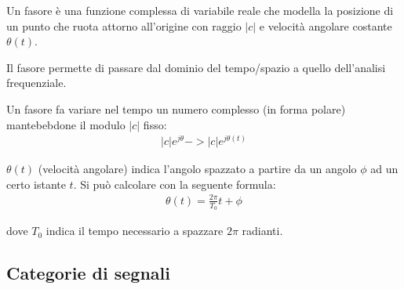 \documentclass[a4paper, 10pt]{report}
\begin{document}
\begin{tcolorbox}[title=\textbf{Fasore}]
Un fasore è una funzione complessa di variabile reale che modella la posizione di un punto che ruota attorno all'origine con raggio $|c|$ e velocità angolare costante $\theta(t)$.

Il fasore permette di passare dal dominio del tempo/spazio a quello dell'analisi frequenziale.

Un fasore fa variare nel tempo un numero complesso (in forma polare) mantebebdone il modulo $|c|$ fisso:
\begin{align*}
|c|e^{j \theta} -> |c|e^{j \theta(t)}
\end{align*}

$\theta (t)$ (velocità angolare) indica l'angolo spazzato a partire da un angolo $\phi$ ad un certo istante $t$. Si può calcolare con la seguente formula:
\begin{align*}
\theta (t) = \frac{2 \pi}{T_0} t  + \phi
\end{align*}

dove $T_0$ indica il tempo necessario a spazzare $2 \pi$ radianti.
\end{tcolorbox}

\subsection*{Categorie di segnali}
\end{document}
